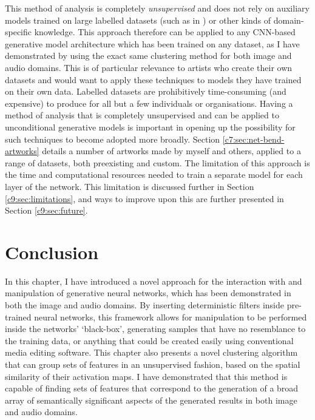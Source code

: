 This method of analysis is completely \emph{unsupervised} and does not rely on auxiliary models trained on large labelled datasets (such as in \citep{Bau2018-td, isola2017image, park2019semantic}) or other kinds of domain-specific knowledge. 
This approach therefore can be applied to any CNN-based generative model architecture which has been trained on any dataset, as I have demonstrated by using the exact same clustering method for both image and audio domains. 
This is of particular relevance to artists who create their own datasets and would want to apply these techniques to models they have trained on their own data. 
Labelled datasets are prohibitively time-consuming (and expensive) to produce for all but a few individuals or organisations. 
Having a method of analysis that is completely unsupervised and can be applied to unconditional generative models is important in opening up the possibility for such techniques to become adopted more broadly.
Section \ref{c7:sec:net-bend-artworks} details a number of artworks made by myself and others, applied to a range of datasets, both preexisting and custom.
The limitation of this approach is the time and computational resources needed to train a separate model for each layer of the network.
This limitation is discussed further in Section \ref{c9:sec:limitations}, and ways to improve upon this are further presented in Section \ref{c9:sec:future}.


\section{Conclusion}

In this chapter, I have introduced a novel approach for the interaction with and manipulation of generative neural networks, which has been demonstrated in both the image and audio domains. 
By inserting deterministic filters inside pre-trained neural networks, this framework allows for manipulation to be performed inside the networks' `black-box', generating samples that have no resemblance to the training data, or anything that could be created easily using conventional media editing software. 
This chapter also presents a novel clustering algorithm that can group sets of features in an unsupervised fashion, based on the spatial similarity of their activation maps. 
I have demonstrated that this method is capable of finding sets of features that correspond to the generation of a broad array of semantically significant aspects of the generated results in both image and audio domains. 

